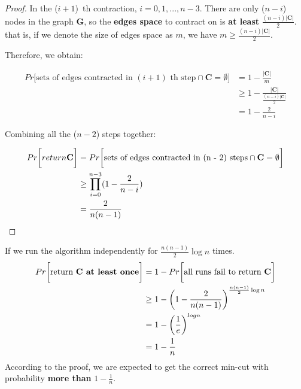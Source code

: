 \documentclass[a4paper, 12pt, titlepage]{article}
\newtheorem{proof}{Proof}
\begin{document}
\begin{proof}

In the ($i + 1$)~th contraction, $i = 0, 1, ..., n - 3$. There are only ({$n - i$}) nodes in the graph \textbf{G}, so the \textbf{edges space} to contract on is \textbf{at least} $\frac{(n - i)|\textbf{C}|}{2}$.
that is, if we denote the size of edges space as $ m $, we have $ m \geq \frac{(n - i) |\textbf{C}|}{2} $. 

Therefore, we obtain:

\begin{equation}
    \begin{aligned}
    Pr \bigg[ \text{sets of edges contracted in $(i + 1)$~th step} \cap \textbf{C} = \emptyset \bigg] &= 1 - \frac{|\textbf{C}|}{m} \\
                                                                                                      &\geq 1 - \frac{|\textbf{C}|}{\frac{(n - i) |\textbf{C}|}{2}} \\
                                                                                                      &= 1 - \frac{2}{n -i}
    \end{aligned}
\end{equation}

Combining all the ($n - 2$) steps together:

\begin{equation}\label{eq: eq2}
    \begin{aligned}
    Pr \bigg[ return \text{\textbf{C}} \bigg] &= Pr \bigg[ \text{sets of edges contracted in (n - 2) steps} \cap \textbf{C} = \emptyset \bigg] \\
                                                    &\geq \prod_{i = 0}^{n - 3} (1 - \frac{2}{n - i}) \\
                                                    &= \frac{2}{n ( n - 1)}
    \end{aligned}
\end{equation}

\end{proof}

If we run the algorithm independently for $\frac{n (n - 1)}{2} \log n$ times.
\begin{equation}
    \begin{aligned}
        Pr \bigg[ \text{return \textbf{C at least once}} \bigg] &= 1 - Pr \bigg[ \text{all runs fail to return \textbf{C}} \bigg] \\
                                                                           &\geq 1 - \bigg( 1 - \frac{2}{n ( n - 1)} \bigg)^{\frac{n (n - 1)}{2} \log n} \\
                                                                           &= 1 - \bigg( \frac{1}{e} \bigg)^{log n} \\
                                                                           &= 1 - \frac{1}{n}
    \end{aligned}
\end{equation}
According to the proof, we are expected to get the correct min-cut with probability \textbf{more than} $1 - \frac{1}{n}$.
\end{document}

